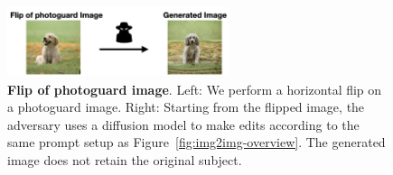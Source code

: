 \begin{figure}[h]
\begin{center}
\includegraphics[width=0.58\textwidth]{images/flip-and-blur-figures.001.png}
\end{center}
\caption{\textbf{Flip of photoguard image}. Left: We perform a horizontal flip on a photoguard image. Right: Starting from the flipped image, the adversary uses a diffusion model to make edits according to the same prompt setup as Figure~\ref{fig:img2img-overview}. The generated image does not retain the original subject.}
\label{figure-flip}
\end{figure}